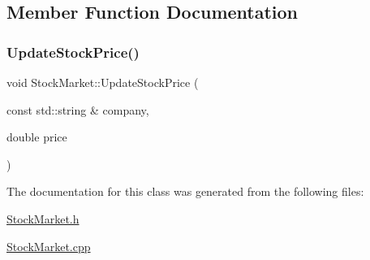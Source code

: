 \subsection{Member Function Documentation}
\mbox{\label{class_stock_market_a3892e4e02e76097244ae3f2c5265a216}} 
\subsubsection{\texorpdfstring{UpdateStockPrice()}{UpdateStockPrice()}}
{\footnotesize\ttfamily void Stock\+Market\+::\+Update\+Stock\+Price (\begin{DoxyParamCaption}\item[{const std\+::string \&}]{company,  }\item[{double}]{price }\end{DoxyParamCaption})}



The documentation for this class was generated from the following files\+:\begin{DoxyCompactItemize}
\item 
\mbox{\hyperlink{_stock_market_8h}{Stock\+Market.\+h}}\item 
\mbox{\hyperlink{_stock_market_8cpp}{Stock\+Market.\+cpp}}\end{DoxyCompactItemize}
